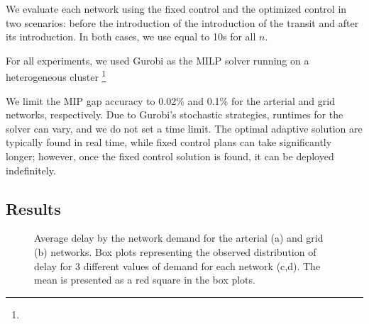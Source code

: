 We evaluate each network using the fixed control and the optimized control in
two scenarios: before the introduction of the introduction of the transit and
after its introduction. In both cases, we use \DT[] equal to 10s for all $n$.

For all experiments, we used Gurobi as the MILP solver running on a
heterogeneous cluster \footnote{}

We limit the MIP gap accuracy to 0.02\% and 0.1\% for the arterial and grid
networks, respectively.
%
Due to Gurobi's stochastic strategies, runtimes for the solver can vary,
and we do not set a time limit.
%
The optimal adaptive solution are typically found in real time, while fixed
control plans can take significantly longer; however, once the fixed control
solution is found, it can be deployed indefinitely.




\subsection{Results}

\begin{figure*}[t!] \centering
%
\caption{Average delay by the network demand for the arterial (a) and grid (b)
networks. Box plots representing the observed distribution of delay for 3
different values of demand for each network (c,d). The mean is presented as a
red square in the box plots.}
%
\label{fig:delayCurveAndBoxplot} \end{figure*}


%


